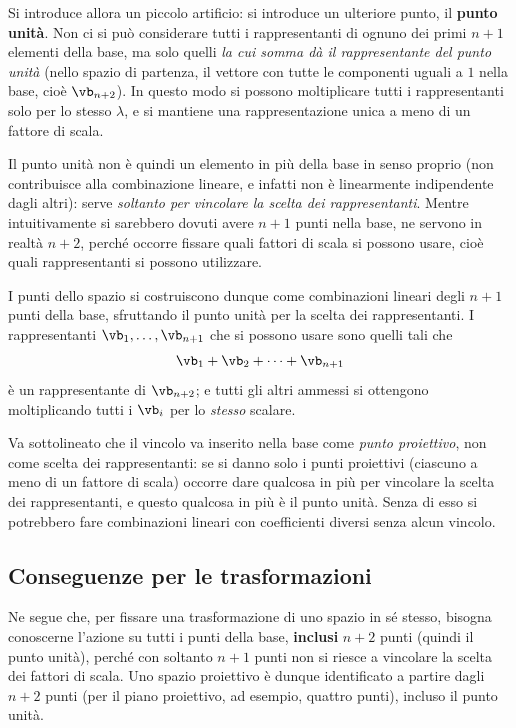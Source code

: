 Si introduce allora un piccolo artificio: si introduce un ulteriore punto, il \textbf{punto unità}. Non ci si può considerare tutti i rappresentanti di ognuno dei primi $n+1$ elementi della base, ma solo quelli \emph{la cui somma dà il rappresentante del punto unità} (nello spazio di partenza, il vettore con tutte le componenti uguali a $1$ nella base, cioè $\vb_{n+2}$). In questo modo si possono moltiplicare tutti i rappresentanti solo per lo stesso $\lambda$, e si mantiene una rappresentazione unica a meno di un fattore di scala.

Il punto unità non è quindi un elemento in più della base in senso proprio (non contribuisce alla combinazione lineare, e infatti non è linearmente indipendente dagli altri): serve \emph{soltanto per vincolare la scelta dei rappresentanti}. Mentre intuitivamente si sarebbero dovuti avere $n+1$ punti nella base, ne servono in realtà $n+2$, perché occorre fissare quali fattori di scala si possono usare, cioè quali rappresentanti si possono utilizzare.

I punti dello spazio si costruiscono dunque come combinazioni lineari degli $n+1$ punti della base, sfruttando il punto unità per la scelta dei rappresentanti. I rappresentanti $\vb_1,\dots,\vb_{n+1}$ che si possono usare sono quelli tali che
\[
  \vb_1+\vb_2+\dots+\vb_{n+1}
\]
è un rappresentante di $\vb_{n+2}$; e tutti gli altri ammessi si ottengono moltiplicando tutti i $\vb_i$ per lo \emph{stesso} scalare.

Va sottolineato che il vincolo va inserito nella base come \emph{punto proiettivo}, non come scelta dei rappresentanti: se si danno solo i punti proiettivi (ciascuno a meno di un fattore di scala) occorre dare qualcosa in più per vincolare la scelta dei rappresentanti, e questo qualcosa in più è il punto unità. Senza di esso si potrebbero fare combinazioni lineari con coefficienti diversi senza alcun vincolo.

\subsection{Conseguenze per le trasformazioni}

Ne segue che, per fissare una trasformazione di uno spazio in sé stesso, bisogna conoscerne l'azione su tutti i punti della base, \textbf{inclusi} $n+2$ punti (quindi il punto unità), perché con soltanto $n+1$ punti non si riesce a vincolare la scelta dei fattori di scala. Uno spazio proiettivo è dunque identificato a partire dagli $n+2$ punti (per il piano proiettivo, ad esempio, quattro punti), incluso il punto unità.

